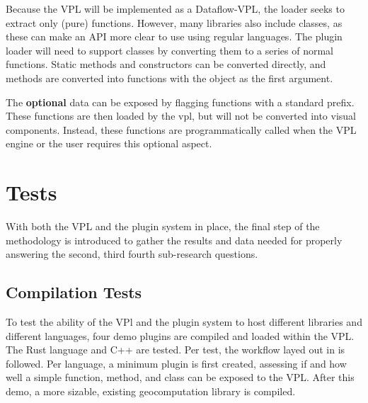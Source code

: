 Because the VPL will be implemented as a Dataflow-VPL, the loader seeks to extract only (pure) functions. 
However, many libraries also include classes, as these can make an API more clear to use using regular languages. 
The plugin loader will need to support classes by converting them to a series of normal functions. 
Static methods and constructors can be converted directly, and methods are converted into functions with the object as the first argument.

The \textbf{optional} data can be exposed by flagging functions with a standard prefix.
These functions are then loaded by the vpl, but will not be converted into visual components. 
Instead, these functions are programmatically called when the VPL engine or the user requires this optional aspect. 


\newpage
\section{Tests}
\label{sec:method:tests}
With both the VPL and the plugin system in place, the final step of the methodology is introduced to gather the results and data needed for properly answering the second, third fourth sub-research questions.


\subsection{Compilation Tests}
To test the ability of the VPl and the plugin system to host different libraries and different languages, four demo plugins are compiled and loaded within the VPL.  
The Rust language and C++ are tested. 
Per test, the workflow layed out in  is followed. 
Per language, a minimum plugin is first created, assessing if and how well a simple function, method, and class can be exposed to the VPL.
After this demo, a more sizable, existing geocomputation library is compiled.

